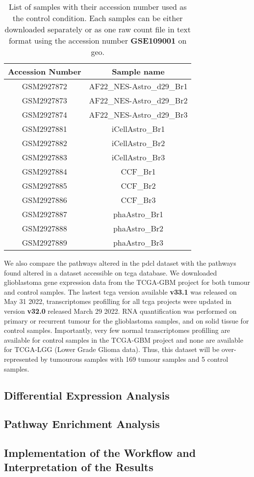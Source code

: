 \begin{table}
    \centering
    \begin{tabular}{ |c|c| }
        \hline
        Accession Number & Sample name \\
        \hline
        GSM2927872 & AF22\_NES-Astro\_d29\_Br1 \\
        GSM2927873 & AF22\_NES-Astro\_d29\_Br2 \\
        GSM2927874 & AF22\_NES-Astro\_d29\_Br3 \\
        \hline
        GSM2927881 & iCellAstro\_Br1 \\
        GSM2927882 & iCellAstro\_Br2 \\
        GSM2927883 & iCellAstro\_Br3 \\
        \hline
        GSM2927884 & CCF\_Br1 \\
        GSM2927885 & CCF\_Br2 \\
        GSM2927886 & CCF\_Br3 \\
        \hline
        GSM2927887 & phaAstro\_Br1 \\ 
        GSM2927888 & phaAstro\_Br2 \\ 
        GSM2927889 & phaAstro\_Br3 \\ 
        \hline
    \end{tabular}
    \caption{
        List of samples with their accession number used as the control condition.
        Each samples can be either downloaded separately or as one raw count file in text format using the accession number \textbf{GSE109001} on \acrshort{geo}.
    }
    \label{table:list-control-samples}
\end{table}

We also compare the pathways altered in the \acrshort{pdcl} dataset with the pathways found altered in a dataset accessible on \acrshort{tcga} database. 
We downloaded glioblastoma gene expression data from the TCGA-GBM project for both tumour and control samples.
The lastest \acrshort{tcga} version available \textbf{v33.1} was released on May 31 2022, transcriptomes profilling for all \acrshort{tcga} projects were updated in version \textbf{v32.0} released March 29 2022.
RNA quantification was performed on primary or recurrent tumour for the glioblastoma samples, and on solid tissue for control samples.
Importantly, very few normal transcriptomes profilling are available for control samples in the TCGA-GBM project and none are available for TCGA-LGG (Lower Grade Glioma data).
Thus, this dataset will be over-represented by tumourous samples with 169 tumour samples and 5 control samples.

\subsection{Differential Expression Analysis}

\subsection{Pathway Enrichment Analysis}

\subsection{Implementation of the Workflow and Interpretation of the Results}

